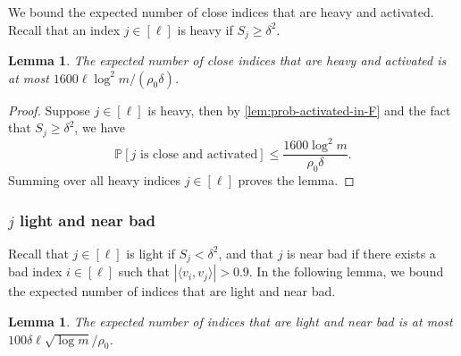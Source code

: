 \documentclass[reqno]{amsart}
\newtheorem{lemma}[theorem]{Lemma}
\theoremstyle{remark}
\theoremstyle{definition}
\numberwithin{theorem}{section}
\renewcommand{\(}{\bigl(}
\renewcommand{\)}{\bigr)\vphantom{)}}
\renewcommand{\le}{\leqslant}
\renewcommand{\ge}{\geqslant}
\renewcommand{\P}{\mathbb{P}}
\newcommand{\ang}[1]{\langle#1\rangle}
\begin{document}
We bound the expected number of close indices that are heavy and activated. Recall that an index $j\in [\ell]$ is heavy if $S_j \ge \delta^2$.

\begin{lemma}\label{lem:num-heavy-in-F}
    The expected number of close indices that are heavy and activated is at most $1600\ell\log^2 m/(\rho_0\delta)$. 

\end{lemma}

\begin{proof}
    Suppose $j\in [\ell]$ is heavy, then by \cref{lem:prob-activated-in-F} and the fact that $S_j \ge \delta^2$, we have
    \[\P[j\text{ is close and activated}] \le \frac{1600\log^2 m}{\rho_0\delta}.\]
    Summing over all heavy indices $j\in [\ell]$ proves the lemma.
\end{proof}


\subsubsection{$j$ light and near bad}

Recall that $j\in [\ell]$ is light if $S_j< \delta^2$, and that $j$ is near bad if there exists a bad index $i\in [\ell]$ such that $|\ang{v_i,v_j}| > 0.9$. In the following lemma, we bound the expected number of indices that are light and near bad.

\begin{lemma}\label{lem:num-light-near-bad}
    The expected number of indices that are light and near bad is at most $100\delta \ell\sqrt{\log m}/\rho_0$.
\end{lemma}
\end{document}
